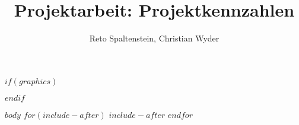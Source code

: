 



$if(graphics)$

\makeatletter
\def\maxwidth{\ifdim\Gin@nat@width>\linewidth\linewidth
\else\Gin@nat@width\fi}
\makeatother
\let\Oldincludegraphics\includegraphics
\renewcommand{\includegraphics}[1]{\Oldincludegraphics[width=\maxwidth]{#1}}
$endif$

\VerbatimFootnotes

\setlength{\parindent}{0pt}
\setlength{\parskip}{6pt plus 2pt minus 1pt}
\setlength{\emergencystretch}{3em}  %
\providecommand{\tightlist}{%
  \setlength{\itemsep}{0pt}\setlength{\parskip}{0pt}}
\VerbatimFootnotes %

\title{Projektarbeit: Projektkennzahlen}
\author{Reto Spaltenstein, Christian Wyder}



\setcounter{page}{1}


\tableofcontents
\newpage

$body$
$for(include-after)$
  $include-after$
$endfor$


